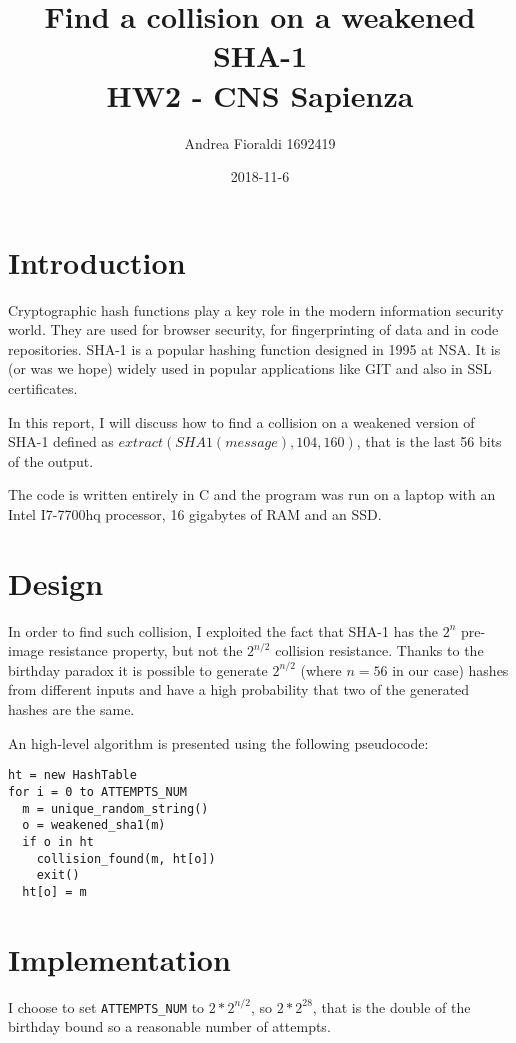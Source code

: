\documentclass[11pt]{article}
\title{{\bf Find a collision on a weakened SHA-1} \\ \bigskip \large HW2 - CNS Sapienza}
\date{2018-11-6}
\author{Andrea Fioraldi 1692419}
\begin{document}
\maketitle

\section{Introduction}

Cryptographic hash functions play a key role in the modern information security world.
They are used for browser security, for fingerprinting of data and in code repositories.
SHA-1 is a popular hashing function designed in 1995 at NSA. It is (or was we hope) widely used in popular applications like GIT and also in SSL certificates.

In this report, I will discuss how to find a collision on a weakened version of SHA-1 defined as $extract(SHA1(message), 104, 160)$, that is the last 56 bits of the output.

The code is written entirely in C and the program was run on a laptop with an Intel I7-7700hq processor, 16 gigabytes of RAM and an SSD.

\section{Design}

In order to find such collision, I exploited the fact that SHA-1 has the $2^n$ pre-image resistance property, but not the $2^{n/2}$ collision resistance.
Thanks to the birthday paradox it is possible to generate $2^{n/2}$ (where $n = 56$ in our case) hashes from different inputs and have a high probability that two of the generated hashes are the same.

An high-level algorithm is presented using the following pseudocode:

\begin{verbatim}
ht = new HashTable
for i = 0 to ATTEMPTS_NUM
  m = unique_random_string()
  o = weakened_sha1(m)
  if o in ht
    collision_found(m, ht[o])
    exit()
  ht[o] = m
\end{verbatim}

\section{Implementation}

I choose to set \verb|ATTEMPTS_NUM| to $2*2^{n/2}$, so $2*2^28$, that is the double of the birthday bound so a reasonable number of attempts.
\end{document}
